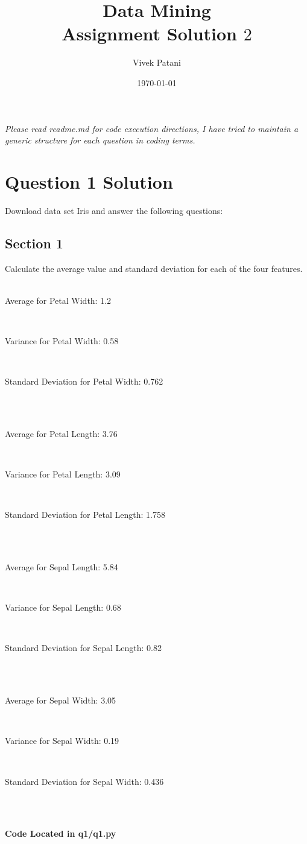 \documentclass[12pt,a4paper,titlepage]{article}
\title{\blue Data Mining \\
\blueb Assignment Solution $2$}
\author{Vivek Patani}
\date{\today}
\begin{document}
\maketitle
\textit{Please read readme.md for code execution directions, I have tried to maintain a generic structure for each question in coding terms.}
\section{Question 1 Solution}{Download data set Iris and answer the following questions:
}
{%
\subsection{Section 1}{ Calculate the average value and standard deviation for each of the four features.\\~\\
\centerline{Average for Petal Width: 1.2}~\\
\centerline{Variance for Petal Width: 0.58}~\\
\centerline{Standard Deviation for Petal Width: 0.762}~\\~\\
\centerline{Average for Petal Length: 3.76}~\\
\centerline{Variance for Petal Length: 3.09}~\\
\centerline{Standard Deviation for Petal Length: 1.758}~\\~\\
\centerline{Average for Sepal Length: 5.84}~\\
\centerline{Variance for Sepal Length: 0.68}~\\
\centerline{Standard Deviation for Sepal Length: 0.82}~\\~\\
\centerline{Average for Sepal Width: 3.05}~\\
\centerline{Variance for Sepal Width: 0.19}\\
\centerline{Standard Deviation for Sepal Width: 0.436}~\\~\\

\centerline{\textbf{Code Located in q1/q1.py}}
}}
\end{document}
